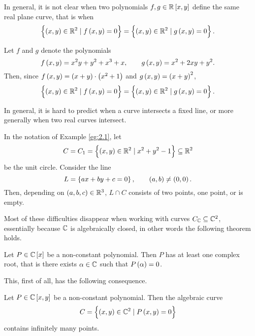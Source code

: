 \begin{fact*}
In general, it is not clear when two polynomials $ f, g \in \R\sbr{x, y} $ define the same real plane curve, that is when
$$ \cbr{\br{x, y} \in \R^2 \mid f\br{x, y} = 0} = \cbr{\br{x, y} \in \R^2 \mid g\br{x, y} = 0}. $$
\end{fact*}

\begin{example}
\label{eg:2.2}
Let $ f $ and $ g $ denote the polynomials
$$ f\br{x, y} = x^2y + y^2 + x^3 + x, \qquad g\br{x, y} = x^2 + 2xy + y^2. $$
Then, since $ f\br{x, y} = \br{x + y} \cdot \br{x^2 + 1} $ and $ g\br{x, y} = \br{x + y}^2 $,
$$ \cbr{\br{x, y} \in \R^2 \mid f\br{x, y} = 0} = \cbr{\br{x, y} \in \R^2 \mid g\br{x, y} = 0}. $$
\end{example}

\begin{fact*}
In general, it is hard to predict when a curve intersects a fixed line, or more generally when two real curves intersect.
\end{fact*}

\begin{example}
In the notation of Example \ref{eg:2.1}, let
$$ C = C_1 = \cbr{\br{x, y} \in \R^2 \mid x^2 + y^2 - 1} \subseteq \R^2 $$
be the unit circle. Consider the line
$$ L = \cbr{ax + by + c = 0}, \qquad \br{a, b} \ne \br{0, 0}. $$
Then, depending on $ \br{a, b, c} \in \R^3 $, $ L \cap C $ consists of two points, one point, or is empty.
\end{example}

Most of these difficulties disappear when working with curves $ C_{\mathbb{C}} \subseteq \mathbb{C}^2 $, essentially because $ \mathbb{C} $ is algebraically closed, in other words the following theorem holds.

\begin{theorem}
\label{thm:2.4}
Let $ P \in \C\sbr{x} $ be a non-constant polynomial. Then $ P $ has at least one complex root, that is there exists $ \alpha \in \mathbb{C} $ such that $ P\br{\alpha} = 0 $.
\end{theorem}

\pagebreak

This, first of all, has the following consequence.

\begin{proposition}
Let $ P \in \C\sbr{x, y} $ be a non-constant polynomial. Then the algebraic curve
$$ C = \cbr{\br{x, y} \in \C^2 \mid P\br{x, y} = 0} $$
contains infinitely many points.
\end{proposition}

